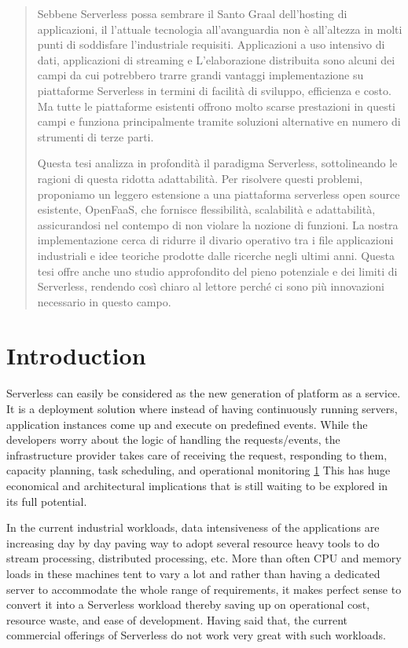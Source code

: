 \documentclass[12pt,titlepage]{article}
\begin{document}
\begin{abstract}
Sebbene Serverless possa sembrare il Santo Graal dell'hosting di applicazioni, il
l'attuale tecnologia all'avanguardia non è all'altezza in molti punti di soddisfare l'industriale
requisiti. Applicazioni a uso intensivo di dati, applicazioni di streaming e
L'elaborazione distribuita sono alcuni dei campi da cui potrebbero trarre grandi vantaggi
implementazione su piattaforme Serverless in termini di facilità di sviluppo,
efficienza e costo. Ma tutte le piattaforme esistenti offrono molto
scarse prestazioni in questi campi e funziona principalmente tramite soluzioni alternative en numero
di strumenti di terze parti.

Questa tesi analizza in profondità il paradigma Serverless,
sottolineando le ragioni di questa ridotta adattabilità. Per risolvere questi problemi, proponiamo un leggero
estensione a una piattaforma serverless open source esistente, OpenFaaS, che fornisce
flessibilità, scalabilità e adattabilità, assicurandosi nel contempo di non violare la nozione
di funzioni. La nostra implementazione cerca di ridurre il divario operativo tra i file
applicazioni industriali e idee teoriche prodotte dalle ricerche negli ultimi anni.
Questa tesi offre anche uno studio approfondito del pieno potenziale e dei limiti di
Serverless, rendendo così chiaro al lettore perché ci sono più innovazioni
necessario in questo campo.

\end{abstract}



\setcounter{tocdepth}{5}
\tableofcontents

\listoffigures

\section{Introduction}
\label{sec:org4188ce2}

Serverless can easily be considered as the new generation of platform as a  
service. It is a deployment solution where instead of having continuously
running servers, application instances come up and execute on predefined events.
While the developers worry about
the logic of handling the requests/events, the infrastructure provider takes
care of receiving the request, responding to them, capacity planning, task
scheduling, and operational monitoring \hyperref[ref:1]{1}
This has huge economical and architectural implications that is
still waiting to be explored in its full potential. 

In the current industrial workloads, data intensiveness of the applications are increasing
day by day paving way to adopt several resource heavy tools to do stream
processing, distributed processing, etc. More than often CPU and memory loads in
these machines tent to vary a lot and rather than having a dedicated server to accommodate the whole range
of requirements, it makes perfect sense to convert it into a Serverless workload
thereby saving up on operational cost, resource waste, and ease of development.
Having said that, the current commercial offerings of Serverless do not work
very great with such workloads.
\end{document}
